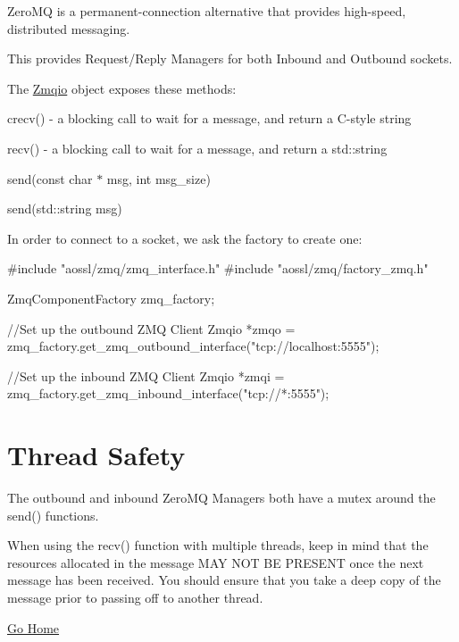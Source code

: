 Zero\+MQ is a permanent-\/connection alternative that provides high-\/speed, distributed messaging.

This provides Request/\+Reply Managers for both Inbound and Outbound sockets.

The \hyperlink{classZmqio}{Zmqio} object exposes these methods\+:


\begin{DoxyItemize}
\item crecv() -\/ a blocking call to wait for a message, and return a C-\/style string
\item recv() -\/ a blocking call to wait for a message, and return a std\+::string
\item send(const char $\ast$ msg, int msg\+\_\+size)
\item send(std\+::string msg)
\end{DoxyItemize}

In order to connect to a socket, we ask the factory to create one\+: \begin{DoxyVerb}#include "aossl/zmq/zmq_interface.h"
#include "aossl/zmq/factory_zmq.h"

ZmqComponentFactory zmq_factory;

//Set up the outbound ZMQ Client
Zmqio *zmqo = zmq_factory.get_zmq_outbound_interface("tcp://localhost:5555");

//Set up the inbound ZMQ Client
Zmqio *zmqi = zmq_factory.get_zmq_inbound_interface("tcp://*:5555");
\end{DoxyVerb}


\section*{Thread Safety}

The outbound and inbound Zero\+MQ Managers both have a mutex around the send() functions.

When using the recv() function with multiple threads, keep in mind that the resources allocated in the message M\+AY N\+OT BE P\+R\+E\+S\+E\+NT once the next message has been received. You should ensure that you take a deep copy of the message prior to passing off to another thread.

\hyperlink{index}{Go Home} 